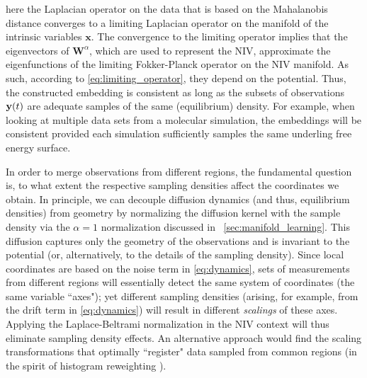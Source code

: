 here the Laplacian operator on the data that is based on the Mahalanobis distance converges to a limiting Laplacian operator on the
manifold of the intrinsic variables $\mathbf{x}$.
%
The convergence to the limiting operator implies that the eigenvectors of $\mathbf{W}^{\alpha}$, which are used to represent the NIV, approximate the eigenfunctions of the limiting Fokker-Planck operator on the NIV manifold.
%
As such, according to \eqref{eq:limiting_operator}, they depend on the potential.
%
Thus, the constructed embedding is consistent as long as the subsets of observations $\mathbf{y}(t)$ are
adequate samples of the same (equilibrium) density.
%
For example, when looking at multiple data sets from a molecular simulation, the embeddings will be consistent provided each simulation sufficiently samples the same underling free energy surface.

In order to merge observations from different regions,
the fundamental question is, to what extent the respective sampling densities affect the coordinates we obtain.
%
In principle, we can decouple diffusion dynamics (and thus, equilibrium densities)
from geometry by normalizing the diffusion kernel with the sample density via the $\alpha=1$ normalization discussed in \sec~\ref{sec:manifold_learning}.
%
%
%
This diffusion captures only the geometry of the observations and is invariant to the potential (or, alternatively,
to the details of the sampling density).
%
Since local coordinates are based on the noise term in \eqref{eq:dynamics}, sets of measurements from different regions
will essentially detect the same system of coordinates (the same variable ``axes");
yet different sampling densities (arising, for example,
from the drift term in \eqref{eq:dynamics}) will result in different {\em scalings} of these axes.
%
Applying the Laplace-Beltrami normalization in the NIV context will thus eliminate sampling density effects.
%
An alternative approach would find the scaling transformations that optimally ``register"
data sampled from common regions (in the spirit of histogram reweighting \cite{ferrenberg1988new}).

